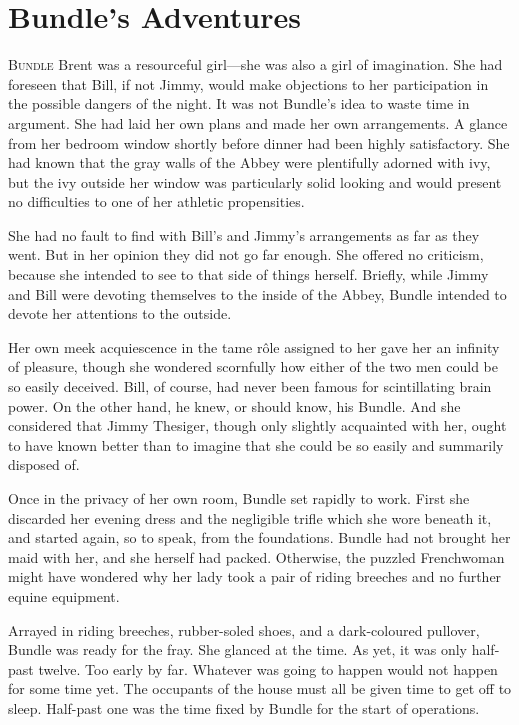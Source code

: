 \chapter{Bundle's Adventures}

\lettrine{B}{undle} Brent was a resourceful girl—she was also a girl of imagination. She had foreseen that Bill, if not Jimmy, would make objections to her participation in the possible dangers of the night. It was not Bundle's idea to waste time in argument. She had laid her own plans and made her own arrangements. A glance from her bedroom window shortly before dinner had been highly satisfactory. She had known that the gray walls of the Abbey were plentifully adorned with ivy, but the ivy outside her window was particularly solid looking and would present no difficulties to one of her athletic propensities.

She had no fault to find with Bill's and Jimmy's arrangements as far as they went. But in her opinion they did not go far enough. She offered no criticism, because she intended to see to that side of things herself. Briefly, while Jimmy and Bill were devoting themselves to the inside of the Abbey, Bundle intended to devote her attentions to the outside.

Her own meek acquiescence in the tame rôle assigned to her gave her an infinity of pleasure, though she wondered scornfully how either of the two men could be so easily deceived. Bill, of course, had never been famous for scintillating brain power. On the other hand, he knew, or should know, his Bundle. And she considered that Jimmy Thesiger, though only slightly acquainted with her, ought to have known better than to imagine that she could be so easily and summarily disposed of.

Once in the privacy of her own room, Bundle set rapidly to work. First she discarded her evening dress and the negligible trifle which she wore beneath it, and started again, so to speak, from the foundations. Bundle had not brought her maid with her, and she herself had packed. Otherwise, the puzzled Frenchwoman might have wondered why her lady took a pair of riding breeches and no further equine equipment.

Arrayed in riding breeches, rubber-soled shoes, and a dark-coloured pullover, Bundle was ready for the fray. She glanced at the time. As yet, it was only half-past twelve. Too early by far. Whatever was going to happen would not happen for some time yet. The occupants of the house must all be given time to get off to sleep. Half-past one was the time fixed by Bundle for the start of operations.

